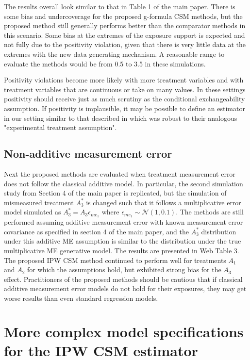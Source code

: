 \documentclass[12pt]{article}
\begin{document}
The results overall look similar to that in Table 1 of the main paper. There is some bias and undercoverage for the proposed g-formula CSM methods, but the proposed method still generally performs better than the comparator methods in this scenario. Some bias at the extremes of the exposure support is expected and not fully due to the positivity violation, given that there is very little data at the extremes with the new data generating mechanism. A reasonable range to evaluate the methods would be from 0.5 to 3.5 in these simulations.

Positivity violations become more likely with more treatment variables and with treatment variables that are continuous or take on many values. In these settings positivity should receive just as much scrutiny as the conditional exchangeability assumption. If positivity is implausible, it may be possible to define an estimator in our setting similar to that described in \citet{neugebauer2005} which was robust to their analogous "experimental treatment assumption".

\subsection{Non-additive measurement error}

Next the proposed methods are evaluated when treatment measurement error does not follow the classical additive model. In particular, the second simulation study from Section 4 of the main paper is replicated, but the simulation of mismeasured treatment $A^{*}_{3}$ is changed such that it follows a multiplicative error model simulated as $A_{3}^{*} = A_{3} \epsilon_{me_{1}}$ where $\epsilon_{me_{1}} \sim \mathcal{N}(1, 0.1)$. The methods are still performed assuming additive measurement error with known measurement error covariance as specified in section 4 of the main paper, and the $A^{*}_{3}$ distribution under this additive ME assumption is similar to the distribution under the true multiplicative ME generative model. The results are presented in Web Table 3. The proposed IPW CSM method continued to perform well for treatments $A_{1}$ and $A_{2}$ for which the assumptions hold, but exhibited strong bias for the $A_{3}$ effect. Practitioners of the proposed methods should be cautious that if classical additive measurement error models do not hold for their exposures, they may get worse results than even standard regression models.

\section{More complex model specifications for the IPW CSM estimator}
\end{document}

